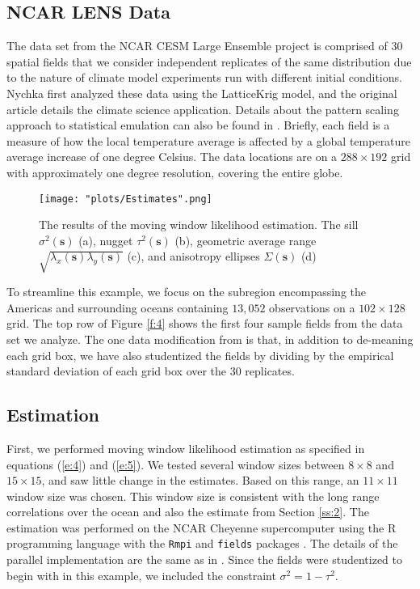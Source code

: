 \documentclass[review]{elsarticle}
\begin{document}
\subsection{NCAR LENS Data}

The data set from the NCAR CESM Large Ensemble project \cite{kay2015community} is comprised of 30 spatial fields that we consider independent replicates of the same distribution due to the nature of climate model experiments run with different initial conditions. Nychka \cite{nychka2018modeling} first analyzed these data using the LatticeKrig model, and the original article details the climate science application. Details about the pattern scaling approach to statistical emulation can also be found in \cite{alexeeff2018emulating}. Briefly, each field is a measure of how the local temperature average is affected by a global temperature average increase of one degree Celsius. The data locations are on a $288 \times 192$ grid with approximately one degree resolution, covering the entire globe. 

\begin{figure}
    \centering
    \texttt{[image: "plots/Estimates".png]}
    \caption{The results of the moving window likelihood estimation. The sill $\sigma^2( \mathbf s)$ (a), nugget $\tau^2( \mathbf s)$ (b), geometric average range $\sqrt{\lambda_x ( \mathbf s) \lambda_y ( \mathbf s)}$ (c), and anisotropy ellipses $\Sigma ( \mathbf s)$ (d)}
    \label{f:3}
\end{figure}

To streamline this example, we focus on the subregion encompassing the Americas and surrounding oceans containing $13,052$ observations on a $102 \times 128$ grid. The top row of Figure \ref{f:4} shows the first four sample fields from the data set we analyze. The one data modification from \cite{nychka2018modeling} is that, in addition to de-meaning each grid box, we have also studentized the fields by dividing by the empirical standard deviation of each grid box over the 30 replicates. 

\subsection{Estimation}


First, we performed moving window likelihood estimation as specified in equations (\ref{e:4}) and (\ref{e:5}). We tested several window sizes between $8 \times 8$ and $15 \times 15$, and saw little change in the estimates.  Based on this range, an $11 \times 11$ window size was chosen. This window size is consistent with the long range correlations over the ocean and also the estimate from Section \ref{ss:2}. The estimation was performed on the NCAR Cheyenne supercomputer \cite{cheyenne} using the R programming language \cite{Rcore} with the \texttt{Rmpi} \cite{yu2002rmpi} and \texttt{fields} packages \cite{fields}. The details of the parallel implementation are the same as in \cite{nychka2018modeling}. Since the fields were studentized to begin with in this example, we included the constraint $\sigma^2 = 1 - \tau^2$.
\end{document}
